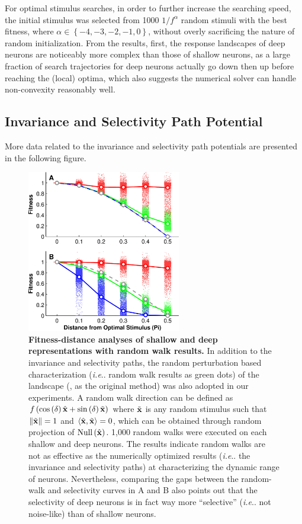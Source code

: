 \documentclass{article} %
\makeatletter
\DeclareRobustCommand\onedot{\futurelet\@let@token\@onedot}
\def\@onedot{\ifx\@let@token.\else.\null\fi\xspace}
\def\ie{\emph{i.e}\onedot} \def\Ie{\emph{I.e}\onedot}
\makeatother
\begin{document}
For optimal stimulus searches, in order to further increase the searching speed, the initial stimulus {was} selected from 1000 ${1}/{f^{\alpha}}$ random stimuli with the best fitness, where $\alpha \in \left\lbrace -4,-3,-2,-1,0 \right\rbrace$, without overly sacrificing the nature of random initialization.
From the results, first, the response landscapes of deep neurons are noticeably more complex than those of shallow neurons, as a large fraction of search trajectories for deep neurons actually go down then up before reaching the (local) optima, which also suggests the numerical solver can handle non-convexity reasonably well.


\subsection{Invariance and Selectivity Path Potential}
More data related to the invariance and selectivity path potentials are presented in the following figure.

\begin{figure}[H]
\centering \includegraphics[width=0.60\textwidth]{Figs_supp/e_fig3a_2-nup-crop.pdf} 
\caption{{\bf Fitness-distance analyses of shallow and deep representations with random walk results.} %
In addition to the invariance and selectivity paths, the random perturbation based characterization (\ie random walk results as green dots) of the landscape (\cite{jones1995fitness}, as the original method) was also adopted in our experiments.
A random walk direction can be defined as $f\left(\cos\left(\delta\right)\hat{\bf{x}} + \sin\left(\delta\right)\tilde{\bf{x}}\right)$ where $\tilde{\bf{x}}$ is any random stimulus such that $\left\| \tilde{\bf{x}} \right\| = 1$ and $\left\langle \hat{\bf{x}},\tilde{\bf{x}} \right\rangle = 0$, which can be obtained through random projection of $\mathrm{Null}\left(\hat{\bf{x}}\right)$.
1,000 random walks were executed on each shallow and deep neurons.
The results indicate random walks are not as effective as the numerically optimized results (\ie the invariance and selectivity paths) at characterizing the dynamic range of neurons. 
Nevertheless, comparing the gaps between the random-walk and selectivity curves in A and B also points out that the selectivity of deep neurons is in fact way more ``selective'' (\ie not noise-like) than of shallow neurons.
}
\label{fig:fda}
\end{figure}
\end{document}
